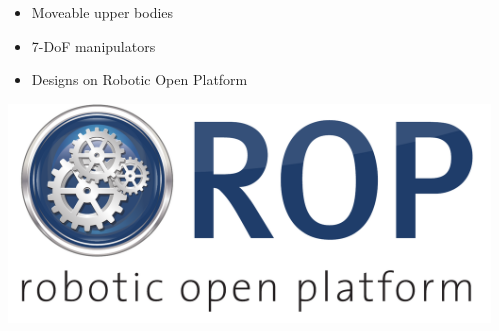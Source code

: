 \documentclass[t]{beamer}
\begin{document}
\begin{frame}
\begin{columns}
\begin{column}{0.4\textwidth}
\begin{itemize}
                \item Moveable upper bodies
                \item 7-DoF manipulators
                \item Designs on Robotic Open Platform
            \end{itemize}
            \begin{center}
                \includegraphics[width = 0.75\linewidth]{Figures/LogoROP_v5}            
            \end{center}
        \end{column}
        \hfill
        \begin{column}{0.3\textwidth}
            \begin{center}

\end{center}
\end{column}
\end{columns}
\end{frame}
\end{document}
